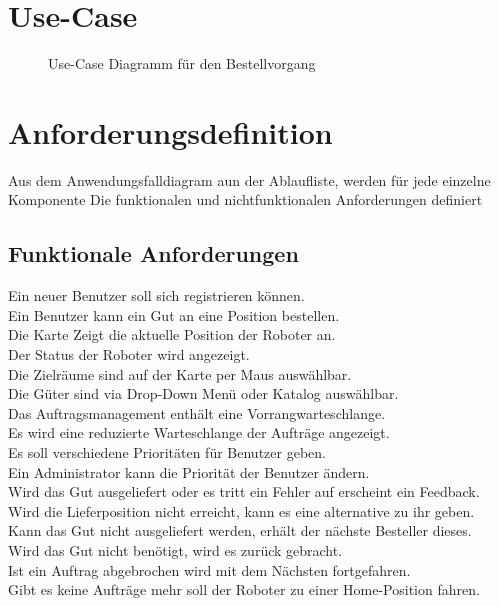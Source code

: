 \section{Use-Case}
\begin{figure}[!ht]
\caption{Use-Case Diagramm für den Bestellvorgang}
\label{fig:use-case}
\end{figure}

\section{Anforderungsdefinition}
Aus dem Anwendungsfalldiagram aun der Ablaufliste, werden für jede einzelne Komponente Die funktionalen und nichtfunktionalen Anforderungen definiert
\subsection{Funktionale Anforderungen}
Ein neuer Benutzer soll sich registrieren können.\\
Ein Benutzer kann ein Gut an eine Position bestellen.\\
Die Karte Zeigt die aktuelle Position der Roboter an.\\
Der Status der Roboter wird angezeigt.\\
Die Zielräume sind auf der Karte per Maus auswählbar.\\
Die Güter sind via Drop-Down Menü oder  Katalog auswählbar.\\
Das Auftragsmanagement enthält eine Vorrangwarteschlange. \\
Es wird eine reduzierte Warteschlange der Aufträge angezeigt.\\
Es soll verschiedene Prioritäten für Benutzer geben.\\
Ein Administrator kann die Priorität der Benutzer ändern.\\
Wird das Gut ausgeliefert oder es tritt ein Fehler auf erscheint ein Feedback.\\
Wird die Lieferposition nicht erreicht, kann es eine alternative zu ihr geben.\\
Kann das Gut nicht ausgeliefert werden, erhält der nächste Besteller dieses.\\
Wird das Gut nicht benötigt, wird es zurück gebracht.\\
Ist ein Auftrag abgebrochen wird mit dem Nächsten fortgefahren.\\
Gibt es keine Aufträge mehr soll der Roboter zu einer Home-Position fahren.\\
